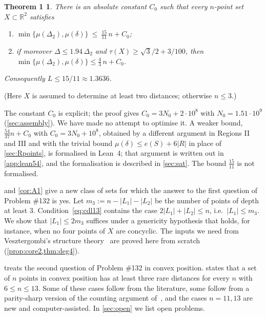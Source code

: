 \documentclass[11pt]{amsart}
\newtheorem*{mainthm}{Theorem 1}
\theoremstyle{definition}
\theoremstyle{remark}
\newcommand{\R}{\mathbb{R}}
\newcommand{\Dt}{\Delta_2}
\newcommand{\mult}{\mu}
\begin{document}
\begin{mainthm}
There is an absolute constant $C_0$ such that every $n$-point set $X\subset\R^2$ satisfies
\begin{enumerate}[label=\textup{(\alph*)}]
\item $\min\{\mult(\Dt),\mult(\delta)\}\ \le\ \tfrac{15}{11}\,n+C_0$;
\item if moreover $\Delta\le1.94\,\Dt$ and $\tau(X)\ge\sqrt3/2+3/100$, then $\min\{\mult(\Dt),\mult(\delta)\}\le\tfrac43\,n+C_0$.
\end{enumerate}
Consequently $L\le 15/11\approx 1.3636$.
\end{mainthm}
(Here $X$ is assumed to determine at least two distances; otherwise $n\le3$.)

The constant $C_0$ is explicit; the proof gives $C_0=3N_0+2\cdot10^8$ with $N_0=1.51\cdot 10^9$ (\cref{sec:assembly}). We have made no attempt to optimise it. A weaker bound, $\frac{54}{37}n+C_0$ with $C_0=3N_0+10^8$, obtained by a different argument in Regions II and III and with the trivial bound $\mult(\delta)\le e(S)+6|R|$ in place of \cref{sec:Rpoints}, is formalised in Lean~4; that argument is written out in \cref{app:lean54}, and the formalisation is described in \cref{sec:sat}. The bound $\frac{15}{11}$ is not formalised.

 and \cref{cor:A1} give a new class of sets for which the answer to the first question of Problem \#132 is yes. Let $m_3:=n-|L_1|-|L_2|$ be the number of points of depth at least $3$. Condition~\eqref{eq:cdl13} contains the case $2|L_1|+|L_2|\le n$, i.e.\ $|L_1|\le m_3$. We show that $|L_1|\le 2m_3$ suffices under a genericity hypothesis that holds, for instance, when no four points of $X$ are concyclic. The inputs we need from Vesztergombi's structure theory~\cite{Ve96} are proved here from scratch (\cref{prop:core2,thm:deg4}).

 treats the second question of Problem \#132 in convex position.  states that a set of $n$ points in convex position has at least three rare distances for every $n$ with $6\le n\le 13$. Some of these cases follow from the literature, some follow from a parity-sharp version of the counting argument of~\cite{CDL25}, and the cases $n=11,13$ are new and computer-assisted. In \cref{sec:open} we list open problems.
\end{document}
